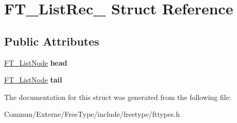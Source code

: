 \hypertarget{struct_f_t___list_rec__}{}\section{F\+T\+\_\+\+List\+Rec\+\_\+ Struct Reference}
\label{struct_f_t___list_rec__}
\subsection*{Public Attributes}
\begin{DoxyCompactItemize}
\item 
\hyperlink{struct_f_t___list_node_rec__}{F\+T\+\_\+\+List\+Node} {\bfseries head}\hypertarget{struct_f_t___list_rec___a09ed35c2bcdc1c3acd12ff4650dfdeb9}{}\label{struct_f_t___list_rec___a09ed35c2bcdc1c3acd12ff4650dfdeb9}

\item 
\hyperlink{struct_f_t___list_node_rec__}{F\+T\+\_\+\+List\+Node} {\bfseries tail}\hypertarget{struct_f_t___list_rec___a4664761f0ab2af3d48231b00cd978b23}{}\label{struct_f_t___list_rec___a4664761f0ab2af3d48231b00cd978b23}

\end{DoxyCompactItemize}


The documentation for this struct was generated from the following file\+:\begin{DoxyCompactItemize}
\item 
Commun/\+Externe/\+Free\+Type/include/freetype/fttypes.\+h\end{DoxyCompactItemize}
